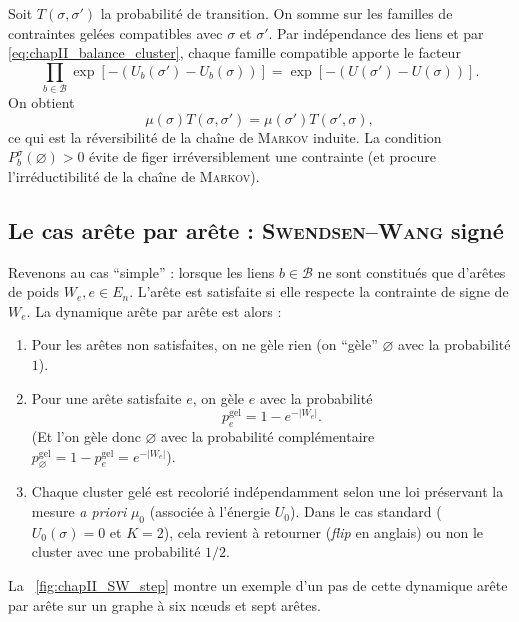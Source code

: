\begin{Preuve}
Soit $T(\sigma,\sigma')$ la probabilité de transition. On somme sur les familles de contraintes gelées compatibles avec $\sigma$ et $\sigma'$. Par indépendance des liens et par \eqref{eq:chapII_balance_cluster}, chaque famille compatible apporte le facteur
\[
    \prod_{b\in\mathcal B}\exp[-(U_b(\sigma')-U_b(\sigma))]
    =
    \exp[-(U(\sigma')-U(\sigma))].
\]
On obtient
\[
    {\mu(\sigma)}T(\sigma,\sigma')={\mu(\sigma')}T(\sigma',\sigma),
\]
ce qui est la réversibilité de la chaîne de \textsc{Markov} induite. La condition $P_b^\sigma(\varnothing)>0$ évite de figer irréversiblement une contrainte (et procure l'irréductibilité de la chaîne de \textsc{Markov}).
\end{Preuve}

\subsection{Le cas arête par arête : \textsc{Swendsen--Wang} signé}

Revenons au cas ``simple'' : lorsque les liens $b \in \mathcal B$ ne sont constitués que d'arêtes de poids $W_e, e \in E_n$.
L'arête est satisfaite si elle respecte la contrainte de signe de $W_e$. La dynamique arête par arête est alors :
\begin{enumerate}
    \item Pour les arêtes non satisfaites, on ne gèle rien (on ``gèle'' $\varnothing$ avec la probabilité $1$).
    \item Pour une arête satisfaite $e$, on gèle $e$ avec la probabilité
    \begin{equation}
        p_e^{\mathrm{gel}}=1-e^{-|W_e|}.
        \label{eq:chapII_freeze_edge_weight}
    \end{equation}
    (Et l'on gèle donc $\varnothing$ avec la probabilité complémentaire $p_{\varnothing}^{\mathrm{gel}} = 1-p_e^{\mathrm{gel}} =  e^{-|W_e|}$).
    \item Chaque cluster gelé est recolorié indépendamment selon une loi préservant la mesure \emph{a priori} $\mu_0$ (associée à l'énergie $U_0$). Dans le cas standard ($U_0(\sigma) = 0$ et $K=2$), cela revient à retourner (\emph{flip} en anglais) ou non le cluster avec une probabilité $1/2$.
\end{enumerate}

La \Fig~\ref{fig:chapII_SW_step} montre un exemple d'un pas de cette dynamique arête par arête sur un graphe à six nœuds et sept arêtes.


